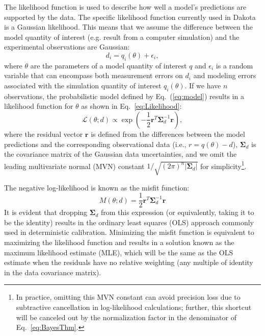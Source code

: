 The likelihood function is used to describe how well a model's
predictions are supported by the data.  
The specific likelihood function currently used in Dakota is a Gaussian
likelihood. This means that we assume the difference between the model quantity of interest
(e.g. result from a computer simulation) and the experimental observations are Gaussian:
\begin{equation}
d_i = q_i(\theta) + \epsilon_i, \label{eq:model}
\end{equation}
where $\theta$ are the parameters of a model quantity of interest $q$ and
$\epsilon_i$ is a random variable that can encompass both measurement
errors on $d_i$ and modeling errors associated with the simulation quantity of interest 
$q_i(\theta)$. %
If we have $n$ observations, the probabilistic model defined by 
Eq.~(\ref{eq:model}) results in a likelihood function for $\theta$ 
as shown in Eq.~\ref{eq:Likelihood}:
\begin{equation}
\mathcal{L}(\theta;d) \propto %
\exp \left(
-\frac{1}{2} \boldsymbol{r}^T \boldsymbol{\Sigma}_d^{-1} \boldsymbol{r} 
\right), \label{eq:Likelihood}
\end{equation}
where the residual vector $\boldsymbol{r}$ is defined from the
differences between the model predictions and the corresponding
observational data (i.e., $r = q(\theta) - d$),
$\boldsymbol{\Sigma}_d$ is the covariance matrix of the Gaussian data
uncertainties, and we omit the leading multivariate normal (MVN)
constant $1/\sqrt{(2\pi)^n |\boldsymbol{\Sigma}_d|}$ for 
simplicity\footnote{In practice, omitting this MVN constant can avoid 
  precision loss due to subtractive cancellation in log-likelihood 
  calculations; further, this shortcut will be canceled out by the 
  normalization factor in the denominator of Eq.~\ref{eq:BayesThm}.}. 

The negative log-likelihood is known as the misfit function:
\begin{equation}
M(\theta;d) = \frac{1}{2} \boldsymbol{r}^T \boldsymbol{\Sigma}_d^{-1} 
\boldsymbol{r} %
\label{eq:misfit}
\end{equation}
It is evident that dropping $\boldsymbol{\Sigma}_d$ from this
expression (or equivalently, taking it to be the identity) results in
the ordinary least squares (OLS) approach commonly used in
deterministic calibration.  Minimizing the misfit function is
equivalent to maximizing the likelihood function and results in a
solution known as the maximum likelihood estimate (MLE), which will be
the same as the OLS estimate when the residuals have no relative
weighting (any multiple of identity in the data covariance matrix).

